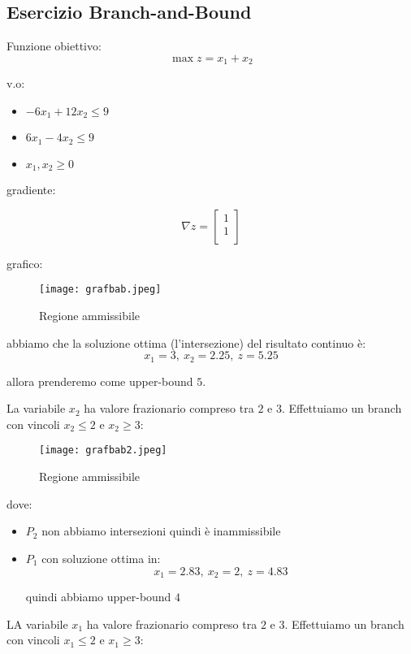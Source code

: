 \subsection{Esercizio Branch-and-Bound}

Funzione obiettivo:
$$\max z = x_1 + x_2$$

v.o:

\begin{itemize}
    \item $-6x_1 + 12x_2 \leq 9$
    \item $6x_1 - 4x_2 \leq 9$
    \item $x_1, x_2 \geq 0$
\end{itemize}

gradiente:

$$\nabla z =
\left[ {\begin{array}{c}
	1 \\
	1 \\
\end{array} } \right]
$$

grafico:

\begin{figure}[H]
\centering
\texttt{[image: grafbab.jpeg]}
\caption{Regione ammissibile} 
\label{grafbab}
\end{figure}

abbiamo che la soluzione ottima (l'intersezione) del risultato continuo è:
$$x_1 = 3,\ x_2 = 2.25,\ z = 5.25$$

allora prenderemo come upper-bound $5$.

La variabile $x_2$ ha valore frazionario compreso tra $2$ e $3$. Effettuiamo un branch con vincoli $x_2 \leq 2$ e $x_2 \geq 3$:

\begin{figure}[H]
\centering
\texttt{[image: grafbab2.jpeg]}
\caption{Regione ammissibile} 
\label{grafbab2}
\end{figure}

dove:

\begin{itemize}
    \item $P_2$ non abbiamo intersezioni quindi è inammissibile
    \item $P_1$ con soluzione ottima in:
        $$x_1 = 2.83,\ x_2 = 2,\ z = 4.83$$
        
        quindi abbiamo upper-bound $4$
\end{itemize}

LA variabile $x_1$ ha valore frazionario compreso tra $2$ e $3$. Effettuiamo un branch con vincoli $x_1 \leq 2$ e $x_1 \geq 3$:

